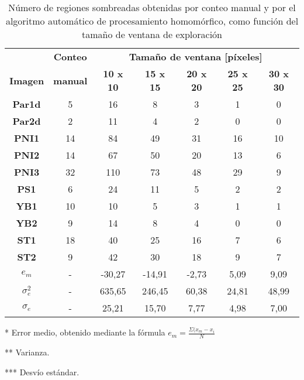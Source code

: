 \begin{table}[]
    \centering
    \begin{threeparttable}[b]
        
        \caption{Número de regiones sombreadas obtenidas por conteo manual y por el algoritmo automático de procesamiento homomórfico, como función del tamaño de ventana de exploración}
        \label{tab:resultados_homomorfico}
        \begin{tabular}{ccccccc}
        \hline
        \hline
                  & \textbf{Conteo}  & \multicolumn{5}{c}{\textbf{Tamaño de ventana [píxeles]}}   \\
            \textbf{Imagen}& \textbf{manual}  & \textbf{10 x 10}     & \textbf{15 x 15}     & \textbf{20 x 20 }   & \textbf{25 x 25}    & \textbf{30 x 30 }   \\ \hline
            \textbf{Par1d}  & 5  & 16      & 8      & 3     & 1     & 0     \\
            \textbf{Par2d}  & 2  & 11      & 4      & 2     & 0     & 0     \\
            \textbf{PNI1}   & 14 & 84     & 49     & 31    & 16    & 10    \\
            \textbf{PNI2}   & 14 & 67     & 50     & 20    & 13    & 6     \\
            \textbf{PNI3}   & 32 & 110    & 73     & 48    & 29    & 9     \\
            \textbf{PS1}    & 6  & 24     & 11     & 5     & 2     & 2     \\ 
            \textbf{YB1}    & 10 & 10     & 5      & 3     & 1     & 1     \\
            \textbf{YB2}    & 9  & 14     & 8      & 4     & 0     & 0     \\
            \textbf{ST1}    & 18 & 40     & 25     & 16    & 7     & 6     \\
            \textbf{ST2}    & 9  & 42     & 30     & 18    & 9     & 7     \\ \hline
            $e_{m}$\tnote{*}    & -  & -30,27 & -14,91 & -2,73 & 5,09  & 9,09  \\ 
            $\sigma^2_{e}$ \tnote{**}   & -  & 635,65  & 246,45 & 60,38 & 24,81 & 48,99 \\
           $\sigma_{e}$ \tnote{***}   & -  & 25,21  & 15,70  & 7,77  & 4,98  & 7,00 \\ \hline \hline
        \end{tabular}
        \begin{tablenotes}
        \footnotesize{
                \item [*]Error medio, obtenido mediante la fórmula $e_{m}=\frac{\Sigma(x_{m}-x_i}{N}$
                \item [**]Varianza.
                \item [***] Desvío estándar.
                }
        \end{tablenotes}
  \end{threeparttable}
\end{table}
       